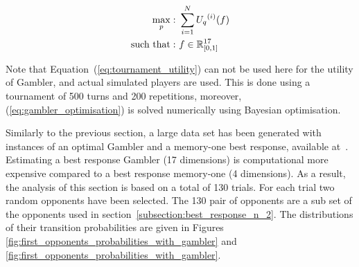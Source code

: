 \begin{equation}\label{eq:gambler_optimisation}
    \begin{aligned}
    \max_p: & \ \sum_{i=1} ^ {N} {U_q}^{(i)} (f)
    \\
    \text{such that}: & \ f \in \mathbb{R}_{[0, 1]}^{17}
    \end{aligned}
\end{equation}

Note that Equation~(\ref{eq:tournament_utility}) can not be used here for the
utility of Gambler, and actual simulated players are used. This is done using a
tournament of 500 turns and 200 repetitions, moreover,
(\ref{eq:gambler_optimisation}) is solved numerically using Bayesian
optimisation.

Similarly to the previous section, a large data set has been generated with
instances of an optimal Gambler and a memory-one best response, available
at~\cite{glynatsi2019}. Estimating a best response Gambler (17 dimensions) is
computational more expensive compared to a best response memory-one (4
dimensions). As a result, the analysis of this section is based on a total of
130 trials. For each trial two random opponents have been selected. The 130 pair
of opponents are a sub set of the opponents used in
section~\ref{subsection:best_response_n_2}. The distributions of their
transition probabilities are given in Figures
\ref{fig:first_opponents_probabilities_with_gambler} and
\ref{fig:first_opponents_probabilities_with_gambler}.

